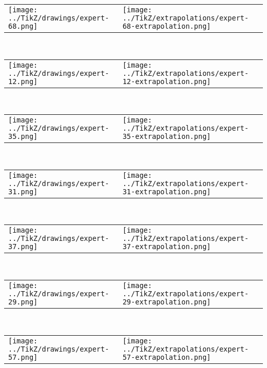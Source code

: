             \begin{tabular}{ll}
    \texttt{[image: ../TikZ/drawings/expert-68.png]}&
    \texttt{[image: ../TikZ/extrapolations/expert-68-extrapolation.png]}
    \end{tabular}        
            \\

            \begin{tabular}{ll}
    \texttt{[image: ../TikZ/drawings/expert-12.png]}&
    \texttt{[image: ../TikZ/extrapolations/expert-12-extrapolation.png]}
    \end{tabular}        
            \\

            \begin{tabular}{ll}
    \texttt{[image: ../TikZ/drawings/expert-35.png]}&
    \texttt{[image: ../TikZ/extrapolations/expert-35-extrapolation.png]}
    \end{tabular}        
            \\

            \begin{tabular}{ll}
    \texttt{[image: ../TikZ/drawings/expert-31.png]}&
    \texttt{[image: ../TikZ/extrapolations/expert-31-extrapolation.png]}
    \end{tabular}        
            \\

            \begin{tabular}{ll}
    \texttt{[image: ../TikZ/drawings/expert-37.png]}&
    \texttt{[image: ../TikZ/extrapolations/expert-37-extrapolation.png]}
    \end{tabular}        
            \\

            \begin{tabular}{ll}
    \texttt{[image: ../TikZ/drawings/expert-29.png]}&
    \texttt{[image: ../TikZ/extrapolations/expert-29-extrapolation.png]}
    \end{tabular}        
            \\

            \begin{tabular}{ll}
    \texttt{[image: ../TikZ/drawings/expert-57.png]}&
    \texttt{[image: ../TikZ/extrapolations/expert-57-extrapolation.png]}
    \end{tabular}        
            \\

